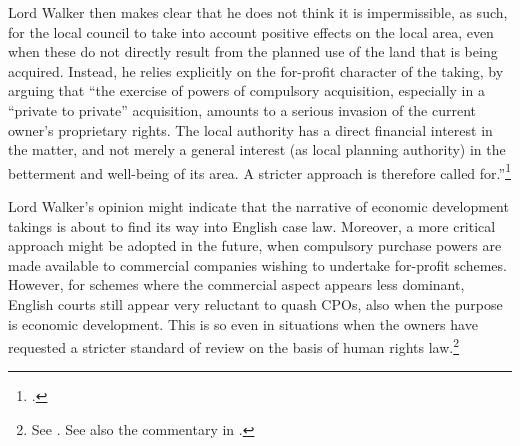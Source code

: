 {Lord Walker then makes clear that he does not think it is impermissible, as such, for the local council to take into account positive effects on the local area, even when these do not directly result from the planned use of the land that is being acquired. Instead, he relies explicitly on the for-profit character of the taking, by arguing that ``the exercise of powers of compulsory acquisition, especially in a ``private to private'' acquisition, amounts to a serious invasion of the current owner's proprietary rights. The local authority has a direct financial interest in the matter, and not merely a general interest (as local planning authority) in the betterment and well-being of its area. A stricter approach is therefore called for.''\footcite[84]{sainsbury10} 

Lord Walker's opinion might indicate that the narrative of economic development takings is about to find its way into English case law. Moreover, a more critical approach might be adopted in the future, when compulsory purchase powers are made available to commercial companies wishing to undertake for-profit schemes. However, for schemes where the commercial aspect appears less dominant, English courts still appear very reluctant to quash CPOs, also when the purpose is economic development. This is so even in situations when the owners have requested a stricter standard of review on the basis of human rights law.\footnote{See \cite{smith08,alliance06}. See also the commentary in \cite[]{gray11}.} }

